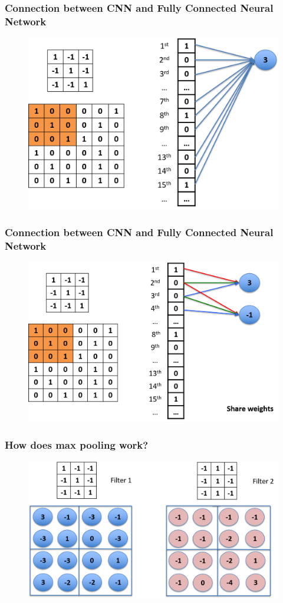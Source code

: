 \documentclass{beamer}
\begin{document}
\begin{frame}
	\frametitle{Connection between CNN and Fully Connected Neural Network}
	\begin{figure}
		\includegraphics[width=0.8\linewidth]{Picture5}
	\end{figure}
\end{frame}

\begin{frame}
	\frametitle{Connection between CNN and Fully Connected Neural Network}
	\begin{figure}
	\includegraphics[width=0.8\linewidth]{Picture6}
	\end{figure}
\end{frame}

\begin{frame}
	\frametitle{How does max pooling work?}
	\begin{figure}
		\includegraphics[width=0.8\linewidth]{Picture7}
	\end{figure}
\end{frame}
\end{document}
